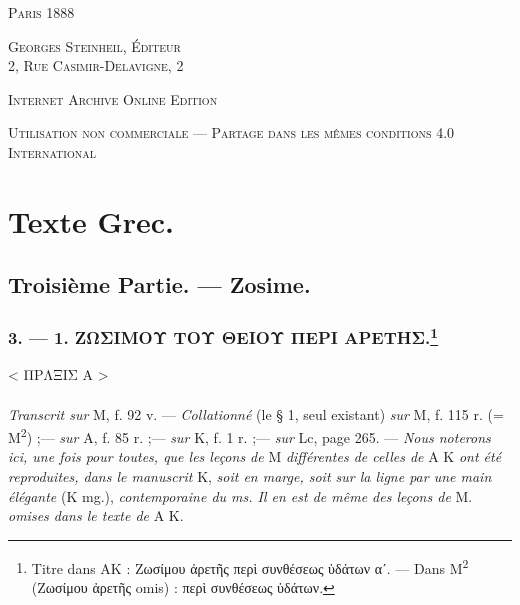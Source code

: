 \documentclass[a4paper, 11pt, oneside, polutonikogreek, french]{article}
\begin{document}
\begin{titlepage}
        \vspace*{\fill}

	\vspace{1\baselineskip}

	{\small\scshape Paris 1888}
	
	{\small\scshape{Georges Steinheil, Éditeur \\2, Rue Casimir-Delavigne, 2}}
	
	\vspace{0.5\baselineskip} %

    \scshape Internet Archive Online Edition  %
	
	{\scshape\small Utilisation non commerciale --- Partage dans les mêmes conditions 4.0 International} %
\end{titlepage}
\setlength{\parskip}{1mm plus1mm minus1mm}
\clearpage
\tableofcontents
\clearpage
\section{Texte Grec.}
\subsection{Troisième Partie. --- Zosime.}
\subsubsection[3. --- 1. ΖΩΣΙΜΟΥ ΤΟΥ ΘΕΙΟΥ ΠΕΡΙ ΑΡΕΤΗΣ.]{3. --- 1. ΖΩΣΙΜΟΥ ΤΟΥ ΘΕΙΟΥ ΠΕΡΙ ΑΡΕΤΗΣ.\footnote{Titre dans AK : Ζωσίμου ἀρετῆς περὶ συνθέσεως ὑδάτων αʹ. --- Dans M\textsuperscript{2} (Ζωσίμου ἀρετῆς omis) : περὶ συνθέσεως ὑδάτων.}}
\begin{center}
< ΠΡΛΞΙΣ Α >
\end{center}
\paragraph{}
\emph{Transcrit sur} M, f. 92 v. --- \emph{Collationné} (le § 1, seul existant) \emph{sur} M, f. 115 r. (= M\textsuperscript{2}) ;--- \emph{sur} A, f. 85 r. ;--- \emph{sur} K, f. 1 r. ;--- \emph{sur} Lc, page 265. --- \emph{Nous noterons ici, une fois pour toutes, que les leçons de} M \emph{différentes de celles de} A K \emph{ont été reproduites, dans le manuscrit} K, \emph{soit en marge, soit sur la ligne par une main élégante} (K mg.), \emph{contemporaine du ms. Il en est de même des leçons de} M. \emph{omises dans le texte de} A K.
\end{document}
